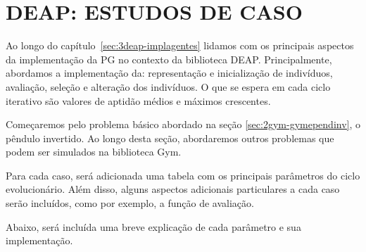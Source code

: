 \section{DEAP: ESTUDOS DE CASO}\label{sec:4ec-estudosdecaso}

Ao longo do capítulo~\ref{sec:3deap-implagentes} lidamos com os principais aspectos da implementação da PG no contexto da biblioteca DEAP. Principalmente, abordamos a implementação da: representação e inicialização de indivíduos, avaliação, seleção e alteração dos indivíduos. O que se espera em cada ciclo iterativo são valores de aptidão médios e máximos crescentes. 

Começaremos pelo problema básico abordado na seção \ref{sec:2gym-gymependinv}, o pêndulo invertido. Ao longo desta seção, abordaremos outros problemas que podem ser simulados na biblioteca Gym.

Para cada caso, será adicionada uma tabela com os principais parâmetros do ciclo evolucionário. Além disso, alguns aspectos adicionais particulares a cada caso serão incluídos, como por exemplo, a função de avaliação. 

Abaixo, será incluída uma breve explicação de cada parâmetro e sua implementação. 

